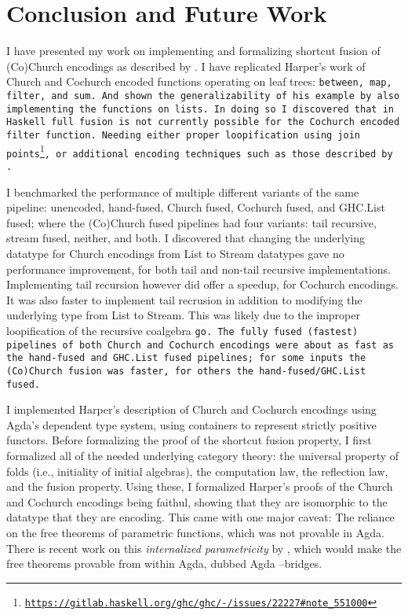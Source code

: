 \section{Conclusion and Future Work}
I have presented my work on implementing and formalizing shortcut fusion of (Co)Church encodings as described by \cite{Harper2011}.
I have replicated Harper's work of Church and Cochurch encoded functions operating on leaf trees: \tt{between}, \tt{map}, \tt{filter}, and \tt{sum}.
And shown the generalizability of his example by also implementing the functions on lists.
In doing so I discovered that in Haskell full fusion is not currently possible for the Cochurch encoded filter function.
Needing either proper loopification using join points\footnote{\url{https://gitlab.haskell.org/ghc/ghc/-/issues/22227\#note_551000}}, or additional encoding techniques such as those described by \cite{Coutts2007}.

I benchmarked the performance of multiple different variants of the same pipeline: unencoded, hand-fused, Church fused, Cochurch fused, and GHC.List fused; where the (Co)Church fused pipelines had four variants: tail recursive, stream fused, neither, and both.
I discovered that changing the underlying datatype for Church encodings from List to Stream datatypes gave no performance improvement, for both tail and non-tail recursive implementations. Implementing tail recursion however did offer a speedup, for Cochurch encodings.
It was also faster to implement tail recrusion in addition to modifying the underlying type from List to Stream.
This was likely due to the improper loopification of the recursive coalgebra \tt{go}.
The fully fused (fastest) pipelines of both Church and Cochurch encodings were about as fast as the hand-fused and GHC.List fused pipelines; for some inputs the (Co)Church fusion was faster, for others the hand-fused/GHC.List fused.

I implemented Harper's description of Church and Cochurch encodings using Agda's dependent type system, using containers to represent strictly positive functors.
Before formalizing the proof of the shortcut fusion property, I first formalized all of the needed underlying category theory: the universal property of folds (i.e., initiality of initial algebras), the computation law, the reflection law, and the fusion property.
Using these, I formalized Harper's proofs of the Church and Cochurch encodings being faithul, showing that they are isomorphic to the datatype that they are encoding.
This came with one major caveat: The reliance on the free theorems of parametric functions, which was not provable in Agda.
There is recent work on this \textit{internalized parametricity} by \cite{Muylder2024}, which would make the free theorems provable from within Agda, dubbed Agda --bridges.

